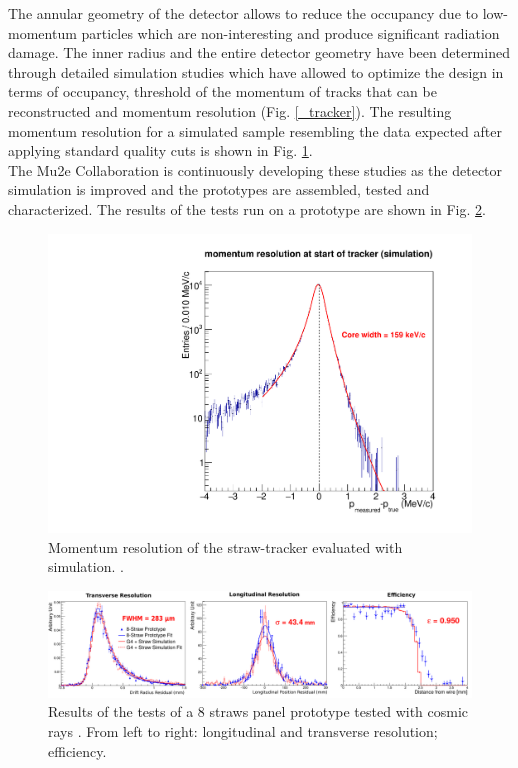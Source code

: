\documentclass[12pt,a4paper,openright, oneside, titlepage]{book} %
\begin{document}
\noindent
The annular geometry of the detector allows to reduce the occupancy due to low-momentum particles which are non-interesting and produce significant radiation damage.
The inner radius and the entire detector geometry have been determined through detailed 
simulation studies which 
have allowed to optimize the design in terms of occupancy, threshold of the momentum 
of tracks that can be reconstructed and momentum resolution (Fig. \ref{_tracker}).
The resulting momentum resolution for a simulated sample resembling the data expected after applying 
standard quality cuts is shown in Fig. \ref{_Tracker_resolution}.\\
The Mu2e Collaboration is continuously developing these studies as the detector simulation is improved and the prototypes are assembled, tested and characterized. The results of the tests run on a prototype are shown in Fig. \ref{_Tracker_prototype}.


\begin{figure}[h!]
\centering
\includegraphics[scale=0.3]{Tracker_resolution}
\caption{Momentum resolution of the straw-tracker evaluated with  simulation. \cite{Giovannella}.}
\label{_Tracker_resolution}
\end{figure}

\begin{figure}[h!]
\centering
\includegraphics[scale=0.7]{Tracker_prototype}
\caption{Results of the tests of a 8 straws panel prototype tested with cosmic rays \cite{Giovannella}. 
From left to right: longitudinal and transverse resolution; efficiency.}
\label{_Tracker_prototype}
\end{figure}
\end{document}
